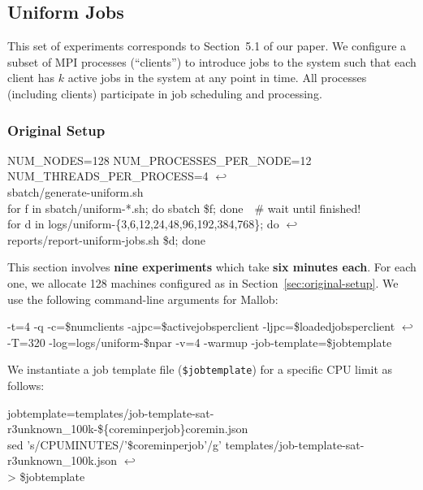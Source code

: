 \documentclass[runningheads]{article}
\newcommand{\CR}{{\tiny$\hookleftarrow$}}
\numberwithin{dummy}{subsection}
\begin{document}
\subsection{Uniform Jobs}
\label{sec:uniform-jobs}

This set of experiments corresponds to Section~5.1 of our paper.
We configure a subset of MPI processes (``clients'') to introduce jobs to the system such that each client has $k$ active jobs in the system at any point in time.
All processes (including clients) participate in job scheduling and processing.

\subsubsection{Original Setup}

\begin{tcolorbox}[
  colback=Magenta!5!white,
  colframe=Magenta!75!black,
  title={\centering Commands for Original Setup}]
\begin{ttfenvcompact}
NUM\_NODES=128 NUM\_PROCESSES\_PER\_NODE=12 NUM\_THREADS\_PER\_PROCESS=4 \CR\\
\hspace*{0.3cm}sbatch/generate-uniform.sh\\
for f in sbatch/uniform-*.sh; do sbatch \$f; done\ \ \# wait until finished!\\
for d in logs/uniform-\{3,6,12,24,48,96,192,384,768\}; do \CR\\ 
\hspace*{0.3cm}reports/report-uniform-jobs.sh \$d; done
\end{ttfenvcompact}
\end{tcolorbox}

This section involves \textbf{nine experiments} which take \textbf{six minutes each}.
For each one, we allocate 128 machines configured as in Section~\ref{sec:original-setup}.
We use the following command-line arguments for Mallob:

\begin{ttfenv}
-t=4 -q -c=\$numclients -ajpc=\$activejobsperclient -ljpc=\$loadedjobsperclient \CR\\
\hspace*{0.3cm}-T=320 -log=logs/uniform-\$npar -v=4 -warmup -job-template=\$jobtemplate
\end{ttfenv}

We instantiate a job template file (\texttt{\$jobtemplate}) for a specific CPU limit as follows:

\begin{ttfenv}
jobtemplate=templates/job-template-sat-r3unknown\_100k-\$\{coreminperjob\}coremin.json\\
sed 's/CPUMINUTES/'\$coreminperjob'/g' templates/job-template-sat-r3unknown\_100k.json \CR\\
\hspace*{0.3cm}> \$jobtemplate
\end{ttfenv}
\end{document}
